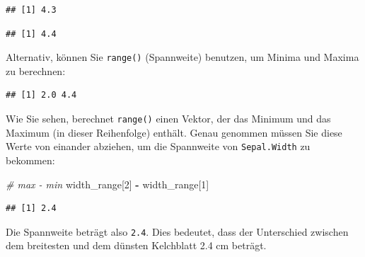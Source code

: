 \documentclass[
  ngerman,
]{book}
\newenvironment{Shaded}{\begin{snugshade}}{\end{snugshade}}
\newcommand{\CommentTok}[1]{\textcolor[rgb]{0.56,0.35,0.01}{\textit{#1}}}
\newcommand{\DecValTok}[1]{\textcolor[rgb]{0.00,0.00,0.81}{#1}}
\newcommand{\FunctionTok}[1]{\textcolor[rgb]{0.13,0.29,0.53}{\textbf{#1}}}
\newcommand{\NormalTok}[1]{#1}
\newcommand{\OtherTok}[1]{\textcolor[rgb]{0.56,0.35,0.01}{#1}}
\newcommand{\SpecialCharTok}[1]{\textcolor[rgb]{0.81,0.36,0.00}{\textbf{#1}}}
\begin{document}
\begin{verbatim}
## [1] 4.3
\end{verbatim}

\begin{Shaded}
\end{Shaded}

\begin{verbatim}
## [1] 4.4
\end{verbatim}

Alternativ, können Sie \texttt{range()} (Spannweite) benutzen, um Minima und Maxima zu berechnen:

\begin{Shaded}
\end{Shaded}

\begin{verbatim}
## [1] 2.0 4.4
\end{verbatim}

Wie Sie sehen, berechnet \texttt{range()} einen Vektor, der das Minimum und das
Maximum (in dieser Reihenfolge) enthält.
Genau genommen müssen Sie diese Werte von einander abziehen, um die Spannweite von
\texttt{Sepal.Width} zu bekommen:

\begin{Shaded}
\begin{Highlighting}[]
\CommentTok{\# max {-} min}
\NormalTok{width\_range[}\DecValTok{2}\NormalTok{] }\SpecialCharTok{{-}}\NormalTok{ width\_range[}\DecValTok{1}\NormalTok{]}
\end{Highlighting}
\end{Shaded}

\begin{verbatim}
## [1] 2.4
\end{verbatim}

Die Spannweite beträgt also \texttt{2.4}. Dies bedeutet, dass der Unterschied zwischen dem breitesten und dem dünsten Kelchblatt 2.4 cm beträgt.
\end{document}
